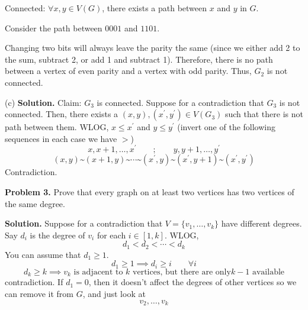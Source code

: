 Connected: $ \forall x,y\in V(G) $, there exists a path between
$ x $ and $ y $ in $ G $.

Consider the path between $ 0001 $ and $ 1101 $.

Changing two bits will always leave the parity the same (since we either add 2
to the sum, subtract 2, or add 1 and subtract 1). Therefore, there is no path
between a vertex of even parity and a vertex with odd
parity. Thus, $ G_2 $ is not connected.

(c) \textbf{Solution.} Claim: $ G_3 $ is connected. Suppose for a contradiction that $ G_3 $
is not connected. Then, there exists a $ (x,y),(x^\prime,y^\prime)\in V(G_3) $
such that there is not path between them. WLOG, $ x\leqslant x^\prime $
and $ y\leqslant y^\prime $ (invert one of the following sequences
in each case we have $ > $)
\[ x,x+1,\ldots ,x^\prime \qquad;\qquad y,y+1,\ldots ,y^\prime \]
\[ (x,y)\text{\textasciitilde}(x+1,y)
\text{\textasciitilde}
\cdots
\text{\textasciitilde}
(x^\prime,y)
\text{\textasciitilde}
(x^\prime,y+1)
\text{\textasciitilde}
(x^\prime,y^\prime) \]
Contradiction.

\textbf{Problem 3.} Prove that every graph on at least two vertices
has two vertices of the same degree.

\textbf{Solution.} Suppose for a contradiction that
$ V=\{v_1,\ldots ,v_k\} $ have different degrees. Say $ d_i $
is the degree of $ v_i $ for each $ i\in[1,k] $. WLOG,
\[ d_1<d_2<\cdots<d_k \]
You can assume that $ d_1\geqslant 1 $.
\[ d_1\geqslant 1 \implies d_i\geqslant i\qquad \forall i \]
\[ d_k\geqslant k \implies v_k\text{ is adjacent to $k$ vertices, but there are only
$k-1$ available} \]
contradiction. If $ d_1=0 $, then it doesn't affect the degrees
of other vertices so we can remove it from $ G $, and just look at
\[ v_2,\ldots,v_k \]
